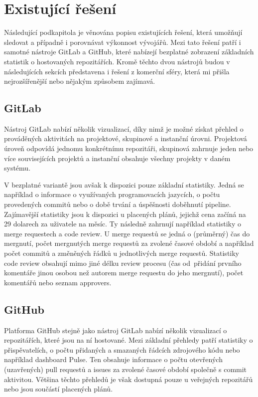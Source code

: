 \section{Existující řešení}
Následující podkapitola je věnována popisu existujících řešení, která umožňují sledovat a případně i porovnávat výkonnost vývojářů. Mezi tato řešení patří i samotné nástroje GitLab a GitHub, které nabízejí bezplatné zobrazení základních statistik o hostovaných repozitářích. Kromě těchto dvou nástrojů budou v následujících sekcích představena i řešení z komerční sféry, která mi přišla nejrozšířenější nebo nějakým způsobem zajímavá.

\subsection{GitLab}
Nástroj GitLab nabízí několik vizualizací, díky nimž je možné získat přehled o prováděných aktivitách na projektové, skupinové a instanční úrovni. Projektová úroveň odpovídá jednomu konkrétnímu repozitáři, skupinová zahrnuje jeden nebo více souvisejících projektů a instanční obsahuje všechny projekty v daném systému.

V bezplatné variantě jsou avšak k dispozici pouze základní statistiky. Jedná se například o informace o využívaných programovacích jazycích, o počtu provedených commitů nebo o době trvání a úspěšnosti doběhnutí pipeline. \cite{GitLab-analytics} Zajímavější statistiky jsou k dispozici u placených plánů, jejichž cena začíná na 29 dolarech za uživatele na měsíc. \cite{GitLab-pricing} Ty následně zahrnují například statistiky o merge requestech a code review. U merge requestů se jedná o (průměrný) čas do mergnutí, počet mergnutých merge requestů za zvolené časové období a například počet commitů a změněných řádků u jednotlivých merge requestů. \cite{GitLab-merge-requests} Statistiky code review obsahují mimo jiné délku review procesu (čas od~přidání prvního komentáře jinou osobou než autorem merge requestu do jeho mergnutí), počet komentářů nebo seznam approvers. \cite{GitLab-code-review}

\subsection{GitHub}
Platforma GitHub stejně jako nástroj GitLab nabízí několik vizualizací o repozitářích, které jsou na ní hostované. Mezi základní přehledy patří statistiky o přispěvatelích, o počtu přidaných a smazaných řádcích zdrojového kódu nebo například dashboard Pulse. Ten obsahuje informace o počtu otevřených (uzavřených) pull requestů a issues za zvolené časové období společně s commit aktivitou. \cite{GitHub-graphs, GitHub-pulse} Většina těchto přehledů je však dostupná pouze u veřejných repozitářů nebo jsou součástí placených plánů. \cite{GitHub-graphs}

